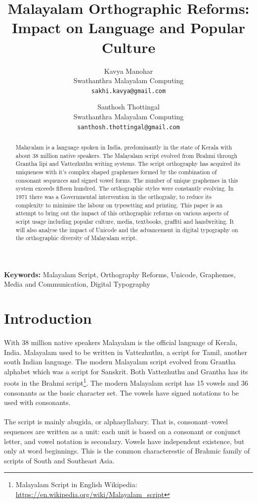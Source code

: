 \documentclass[10pt]{article}
\title{Malayalam Orthographic Reforms: \\Impact on Language and Popular Culture}
\author{Kavya Manohar \\
\small{Swathanthra Malayalam Computing} \\
 {\small {\tt sakhi.kavya@gmail.com}} \\
 \and
 Santhosh Thottingal \\
 \small{Swathanthra Malayalam Computing} \\
 {\small {\tt santhosh.thottingal@gmail.com}}}
\begin{document}
\maketitle

\begin{abstract}

Malayalam is a language spoken in India, predominantly in the state of Kerala with about 38 million native speakers. The Malayalam script evolved from Brahmi through Grantha lipi and Vattezhuthu writing systems. The script orthography has acquired its uniqueness with it's complex shaped graphemes formed by the combination of consonant sequences and signed vowel forms. The number of unique graphemes in this system exceeds fifteen hundred. The orthographic styles were constantly evolving. In 1971 there was a Governmental intervention in the orthograhy, to reduce its complexity to minimise the labour on typesetting and printing. This paper is an attempt to bring out the impact of this orthographic reforms on various aspects of script usage including popular culture, media, textbooks, graffiti and handwriting. It will also analyse the impact of Unicode and the advancement in digital typography on the orthographic diversity of Malayalam script.

\end{abstract}
 \textbf{Keywords:} Malayalam Script, Orthography Reforms, Unicode, Graphemes, Media and Communication, Digital Typography

\section{Introduction}

\paragraph{}

With 38 million native speakers Malayalam is the official language of Kerala, India. Malayalam used to be written in Vattezhuthu, a script for Tamil, another south Indian language. The modern Malayalam script evolved from Grantha alphabet which was a script for Sanskrit. Both Vattezhuthu and Grantha has its roots in the Brahmi script\footnote{Malayalam Script in English Wikipedia: \url{https://en.wikipedia.org/wiki/Malayalam_script}}. The modern Malayalam script has 15 vowels and 36 consonants as the basic character set. The vowels have signed notations to be used with consonants.

\paragraph{}
The script is mainly abugida, or alphasyllabary. That is, consonant–vowel sequences are written as a unit: each unit is based on a consonant or conjunct letter, and vowel notation is secondary. Vowels have independent existence, but only at word beginnings. This is the common characterestic of Brahmic family of scripts of South and Southeast Asia.
\end{document}
